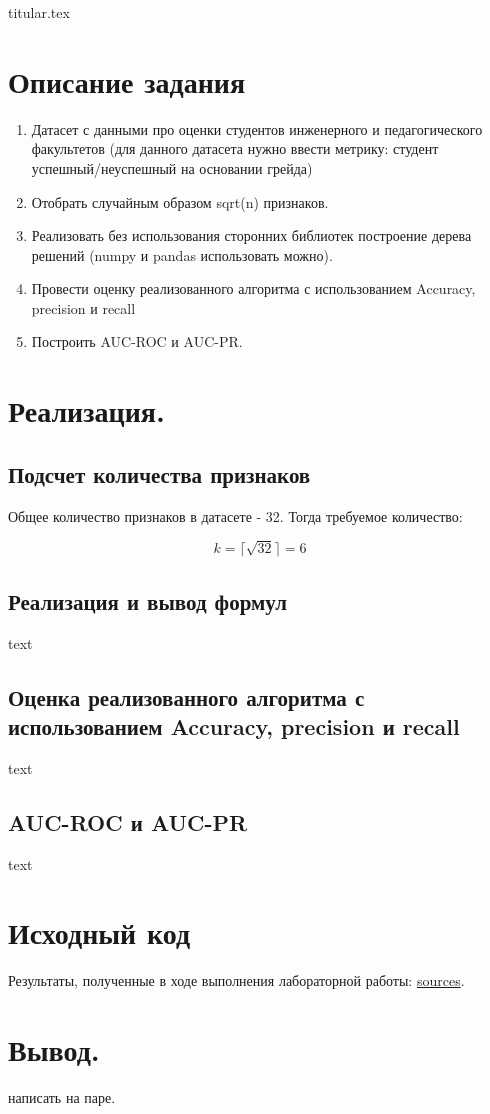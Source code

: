 \documentclass[11pt, a4paper]{article}
\begin{document}
{titular.tex}
\newpage

\section{Описание задания}

\begin{enumerate}
    \item Датасет с данными про оценки студентов инженерного и педагогического факультетов (для данного датасета нужно ввести метрику: студент успешный/неуспешный на основании грейда)
    \item Отобрать случайным образом sqrt(n) признаков.
    \item Реализовать без использования сторонних библиотек построение дерева решений (numpy и pandas использовать можно).
    \item Провести оценку реализованного алгоритма с использованием Accuracy, precision и recall
    \item Построить AUC-ROC и AUC-PR.
\end{enumerate}

\section{Реализация.}

\subsection{Подсчет количества признаков}

Общее количество признаков в датасете - 32. Тогда требуемое количество: 

$$
  k = \lceil \sqrt{32} \rceil = 6
$$

\subsection{Реализация и вывод формул}

text

\subsection{Оценка реализованного алгоритма с использованием Accuracy, precision и recall}

text

\subsection{AUC-ROC и AUC-PR}

text

\section{Исходный код}

 \noindent Результаты, полученные в ходе выполнения лабораторной работы: \href{https://github.com/zubrailx/University-ITMO/blob/main/Year-3/Artificial-intelligence/lab-3}{sources}.
 
\section{Вывод.}

\noindent написать на паре.
\end{document}
